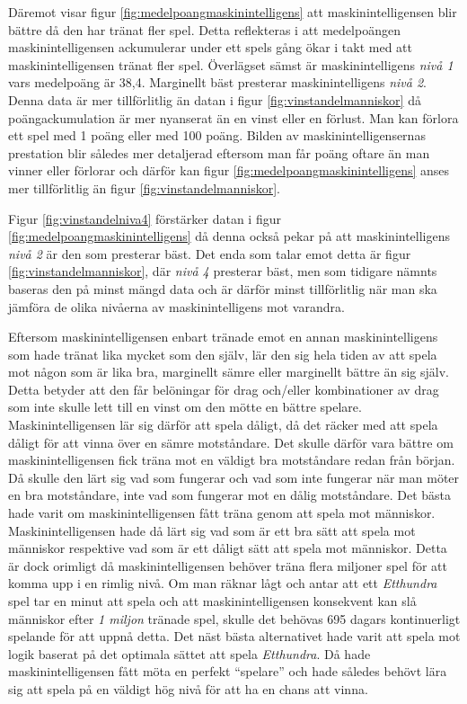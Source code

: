 \documentclass[12pt,a4paper]{article}
\begin{document}
  Däremot visar figur \ref{fig:medelpoangmaskinintelligens} att maskinintelligensen blir bättre då den har tränat fler spel. Detta reflekteras i att medelpoängen maskinintelligensen ackumulerar under ett spels gång ökar i takt med att maskinintelligensen tränat fler spel. Överlägset sämst är maskinintelligens \emph{nivå 1} vars medelpoäng är 38,4. Marginellt bäst presterar maskinintelligens \emph{nivå 2}. Denna data är mer tillförlitlig än datan i figur \ref{fig:vinstandelmanniskor} då poängackumulation är mer nyanserat än en vinst eller en förlust. Man kan förlora ett spel med 1 poäng eller med 100 poäng. Bilden av maskinintelligensernas prestation blir således mer detaljerad eftersom man får poäng oftare än man vinner eller förlorar och därför kan figur \ref{fig:medelpoangmaskinintelligens} anses mer tillförlitlig än figur \ref{fig:vinstandelmanniskor}. 

  Figur \ref{fig:vinstandelniva4} förstärker datan i figur \ref{fig:medelpoangmaskinintelligens} då denna också pekar på att maskinintelligens \emph{nivå 2} är den som presterar bäst. Det enda som talar emot detta är figur \ref{fig:vinstandelmanniskor}, där \emph{nivå 4} presterar bäst, men som tidigare nämnts baseras den på minst mängd data och är därför minst tillförlitlig när man ska jämföra de olika nivåerna av maskinintelligens mot varandra. 

  Eftersom maskinintelligensen enbart tränade emot en annan maskinintelligens som hade tränat lika mycket som den själv, lär den sig hela tiden av att spela mot någon som är lika bra, marginellt sämre eller marginellt bättre än sig själv. Detta betyder att den får belöningar för drag och/eller kombinationer av drag som inte skulle lett till en vinst om den mötte en bättre spelare. Maskinintelligensen lär sig därför att spela dåligt, då det räcker med att spela dåligt för att vinna över en sämre motståndare. Det skulle därför vara bättre om maskinintelligensen fick träna mot en väldigt bra motståndare redan från början. Då skulle den lärt sig vad som fungerar och vad som inte fungerar när man möter en bra motståndare, inte vad som fungerar mot en dålig motståndare. Det bästa hade varit om maskinintelligensen fått träna genom att spela mot människor. Maskinintelligensen hade då lärt sig vad som är ett bra sätt att spela mot människor respektive vad som är ett dåligt sätt att spela mot människor. Detta är dock orimligt då maskinintelligensen behöver träna flera miljoner spel för att komma upp i en rimlig nivå. Om man räknar lågt och antar att ett \emph{Etthundra} spel tar en minut att spela och att maskinintelligensen konsekvent kan slå människor efter \emph{1 miljon} tränade spel, skulle det behövas 695 dagars kontinuerligt spelande för att uppnå detta. Det näst bästa alternativet hade varit att spela mot logik baserat på det optimala sättet att spela \emph{Etthundra}. Då hade maskinintelligensen fått möta en perfekt “spelare” och hade således behövt lära sig att spela på en väldigt hög nivå för att ha en chans att vinna.
\end{document}
